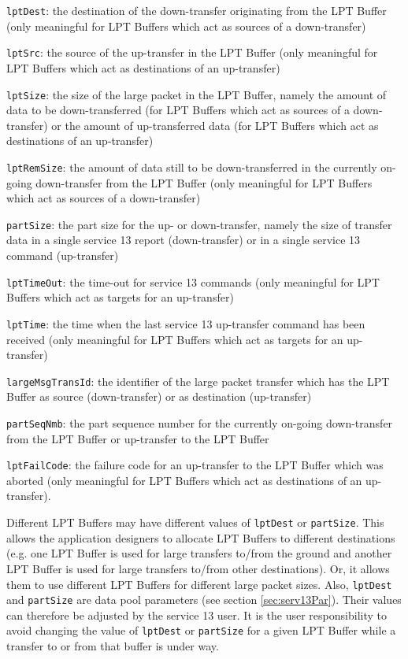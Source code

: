 \documentclass{pnp_article}
\begin{document}
\begin{fw_itemize}
\item \texttt{lptDest}: the destination of the down-transfer originating from the LPT Buffer (only meaningful for LPT Buffers which act as sources of a down-transfer)
\item \texttt{lptSrc}: the source of the up-transfer in the LPT Buffer (only meaningful for LPT Buffers which act as destinations of an up-transfer)
\item \texttt{lptSize}: the size of the large packet in the LPT Buffer, namely the amount of data to be down-transferred (for LPT Buffers which act as sources of a down-transfer) or the amount of up-transferred data (for LPT Buffers which act as destinations of an up-transfer)
\item \texttt{lptRemSize}: the amount of data still to be down-transferred in the currently on-going down-transfer from the LPT Buffer (only meaningful for LPT Buffers which act as sources of a down-transfer)
\item \texttt{partSize}: the part size for the up- or down-transfer, namely the size of transfer data in a single service 13 report (down-transfer) or in a single service 13 command (up-transfer)
\item \texttt{lptTimeOut}: the time-out for service 13 commands (only meaningful for LPT Buffers which act as targets for an up-transfer) 
\item \texttt{lptTime}: the time when the last service 13 up-transfer command has been received (only meaningful for LPT Buffers which act as targets for an up-transfer) 
\item \texttt{largeMsgTransId}: the identifier of the large packet transfer which has the LPT Buffer as source (down-transfer) or as destination (up-transfer)
\item \texttt{partSeqNmb}: the part sequence number for the currently on-going down-transfer from the LPT Buffer or up-transfer to the LPT Buffer
\item \texttt{lptFailCode}: the failure code for an up-transfer to the LPT Buffer which was aborted (only meaningful for LPT Buffers which act as destinations of an up-transfer). 
\end{fw_itemize}

Different LPT Buffers may have different values of \texttt{lptDest} or \texttt{partSize}. This allows the application designers to allocate LPT Buffers to different destinations (e.g. one LPT Buffer is used for large transfers to/from the ground and another LPT Buffer is used for large transfers to/from other destinations). Or, it allows them to use different LPT Buffers for different large packet sizes. Also, \texttt{lptDest} and \texttt{partSize} are data pool parameters (see section \ref{sec:serv13Par}). Their values can therefore be adjusted by the service 13 user. It is the user responsibility to avoid changing the value of \texttt{lptDest} or \texttt{partSize} for a given LPT Buffer while a transfer to or from that buffer is under way.
\end{document}

